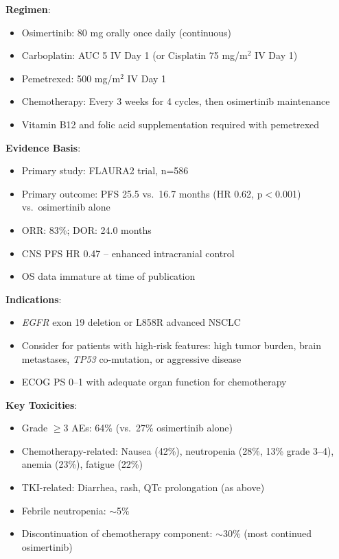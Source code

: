 \documentclass[10pt,letterpaper]{article}
\begin{document}
\begin{tcolorbox}[enhanced,colback=conditionalyellow!10,colframe=conditionalyellow,
title={\textbf{Option 2: Osimertinib + Platinum-Pemetrexed Chemotherapy} \hfill \colorbox{white}{\textbf{CONDITIONAL (1B)}}},
fonttitle=\bfseries\small,coltitle=black]
{\small
\textbf{Regimen}:
\begin{itemize}
\item Osimertinib: 80 mg orally once daily (continuous)
\item Carboplatin: AUC 5 IV Day 1 (or Cisplatin 75 mg/m$^2$ IV Day 1)
\item Pemetrexed: 500 mg/m$^2$ IV Day 1
\item Chemotherapy: Every 3 weeks for 4 cycles, then osimertinib maintenance
\item Vitamin B12 and folic acid supplementation required with pemetrexed
\end{itemize}

\textbf{Evidence Basis}:
\begin{itemize}
\item Primary study: FLAURA2 trial, n=586
\item Primary outcome: PFS 25.5 vs.~16.7 months (HR 0.62, p$<$0.001) vs.~osimertinib alone
\item ORR: 83\%; DOR: 24.0 months
\item CNS PFS HR 0.47 -- enhanced intracranial control
\item OS data immature at time of publication
\end{itemize}

\textbf{Indications}:
\begin{itemize}
\item \textit{EGFR} exon 19 deletion or L858R advanced NSCLC
\item Consider for patients with high-risk features: high tumor burden, brain metastases, \textit{TP53} co-mutation, or aggressive disease
\item ECOG PS 0--1 with adequate organ function for chemotherapy
\end{itemize}

\textbf{Key Toxicities}:
\begin{itemize}
\item Grade $\geq$3 AEs: 64\% (vs.~27\% osimertinib alone)
\item Chemotherapy-related: Nausea (42\%), neutropenia (28\%, 13\% grade 3--4), anemia (23\%), fatigue (22\%)
\item TKI-related: Diarrhea, rash, QTc prolongation (as above)
\item Febrile neutropenia: $\sim$5\%
\item Discontinuation of chemotherapy component: $\sim$30\% (most continued osimertinib)
\end{itemize}

}
\end{tcolorbox}
\end{document}
